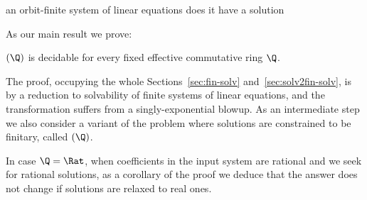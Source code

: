 
\prob{\solvname$(\Q)$}
{an orbit-finite system of linear equations} %
{does it have a solution} %

%

\smallskip

\noindent
As our main result we prove:
%
\begin{theorem} \label{thm:solv}
\solvname$(\Q)$ is decidable for every fixed effective commutative ring $\Q$.
\end{theorem}
%
The proof, occupying the whole Sections~\ref{sec:fin-solv} and~\ref{sec:solv2fin-solv},
 is by a reduction to solvability of finite systems of linear equations, and
the transformation suffers from a singly-exponential blowup.
As an intermediate step 
we also consider a variant of the problem where solutions are constrained to be finitary, called
\finsolvname$(\Q)$.

\begin{slremark}
In case $\Q = \Rat$, when coefficients in the input system are rational and we seek for rational solutions,
as a corollary of the proof we deduce that
the answer does not change if solutions are relaxed to real ones.
\end{slremark}

